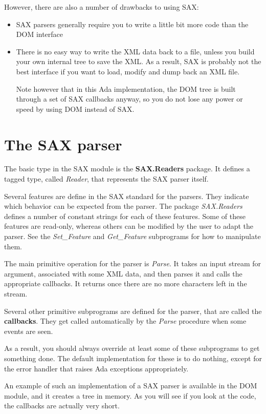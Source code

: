 \documentclass[letterpaper,10pt,english]{sphinxmanual}
\begin{document}
However, there are also a number of drawbacks to using SAX:
\begin{itemize}
\item {} 
SAX parsers generally require you to write a little bit more code than the
DOM interface

\item {} 
There is no easy way to write the XML data back to a file, unless you build
your own internal tree to save the XML.  As a result, SAX is probably not the
best interface if you want to load, modify and dump back an XML file.

Note however that in this Ada implementation, the DOM tree is built through a
set of SAX callbacks anyway, so you do not lose any power or speed by using
DOM instead of SAX.

\end{itemize}


\section{The SAX parser}
\label{sax:the-sax-parser}
The basic type in the SAX module is the \textbf{SAX.Readers} package. It defines a
tagged type, called \emph{Reader}, that represents the SAX parser itself.

Several features are define in the SAX standard for the parsers. They indicate
which behavior can be expected from the parser. The package \emph{SAX.Readers}
defines a number of constant strings for each of these features. Some of these
features are read-only, whereas others can be modified by the user to adapt the
parser. See the \emph{Set\_Feature} and \emph{Get\_Feature} subprograms for how to
manipulate them.

The main primitive operation for the parser is \emph{Parse}. It takes an input
stream for argument, associated with some XML data, and then parses it and
calls the appropriate callbacks. It returns once there are no more characters
left in the stream.

Several other primitive subprograms are defined for the parser, that are called
the \textbf{callbacks}. They get called automatically by the \emph{Parse} procedure when
some events are seen.

As a result, you should always override at least some of these subprograms to
get something done. The default implementation for these is to do nothing,
except for the error handler that raises Ada exceptions appropriately.

An example of such an implementation of a SAX parser is available in the DOM
module, and it creates a tree in memory. As you will see if you look at the
code, the callbacks are actually very short.
\end{document}
